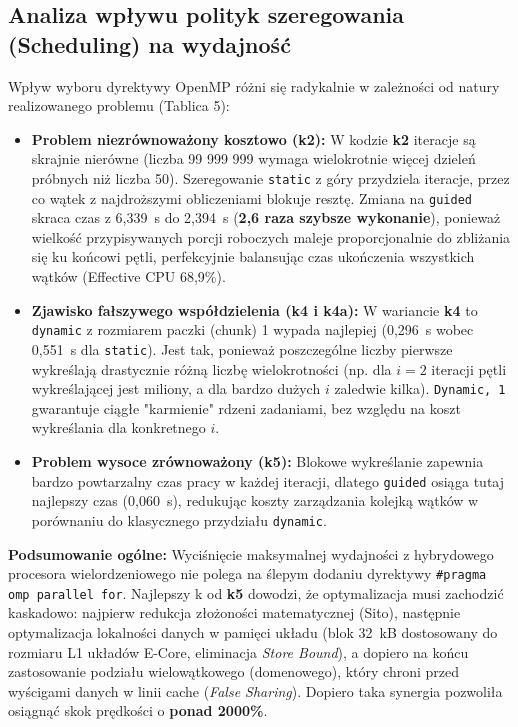 \documentclass[10pt]{article}
\begin{document}
\subsection{Analiza wpływu polityk szeregowania (Scheduling) na wydajność}
Wpływ wyboru dyrektywy OpenMP różni się radykalnie w zależności od natury realizowanego problemu (Tablica 5):
\begin{itemize}
    \item \textbf{Problem niezrównoważony kosztowo (k2):} W kodzie \textbf{k2} iteracje są skrajnie nierówne (liczba 99 999 999 wymaga wielokrotnie więcej dzieleń 
	próbnych niż liczba 50). Szeregowanie \texttt{static} z góry przydziela iteracje, przez co wątek z najdroższymi obliczeniami blokuje resztę. Zmiana na \texttt{guided}
	 skraca czas z 6,339~s do 2,394~s (\textbf{2,6 raza szybsze wykonanie}), ponieważ wielkość przypisywanych porcji roboczych maleje proporcjonalnie do zbliżania się ku 
	 końcowi pętli, perfekcyjnie balansując czas ukończenia wszystkich wątków (Effective CPU 68,9\%).
    \item \textbf{Zjawisko fałszywego współdzielenia (k4 i k4a):} W wariancie \textbf{k4} to \texttt{dynamic} z rozmiarem paczki (chunk) 1 wypada najlepiej 
	(0,296~s wobec 0,551~s dla \texttt{static}). Jest tak, ponieważ poszczególne liczby pierwsze wykreślają drastycznie różną liczbę wielokrotności 
	(np. dla $i=2$ iteracji pętli wykreślającej jest miliony, a dla bardzo dużych $i$ zaledwie kilka). \texttt{Dynamic, 1} gwarantuje ciągłe "karmienie" rdzeni 
	zadaniami, bez względu na koszt wykreślania dla konkretnego $i$.
    \item \textbf{Problem wysoce zrównoważony (k5):} Blokowe wykreślanie zapewnia bardzo powtarzalny czas pracy w każdej iteracji, dlatego \texttt{guided} osiąga 
	tutaj najlepszy czas (0,060~s), redukując koszty zarządzania kolejką wątków w porównaniu do klasycznego przydziału \texttt{dynamic}.
\end{itemize}

\textbf{Podsumowanie ogólne:} 
Wyciśnięcie maksymalnej wydajności z hybrydowego procesora wielordzeniowego nie polega na ślepym dodaniu dyrektywy \texttt{\#pragma omp parallel for}. Najlepszy k
od \textbf{k5} dowodzi, że optymalizacja musi zachodzić kaskadowo: najpierw redukcja złożoności matematycznej (Sito), następnie optymalizacja lokalności danych w
 pamięci układu (blok 32~kB dostosowany do rozmiaru L1 układów E-Core, eliminacja \textit{Store Bound}), a dopiero na końcu zastosowanie podziału wielowątkowego
  (domenowego), który chroni przed wyścigami danych w linii cache (\textit{False Sharing}). Dopiero taka synergia pozwoliła osiągnąć skok prędkości o \textbf{ponad 2000\%}.
\end{document}
